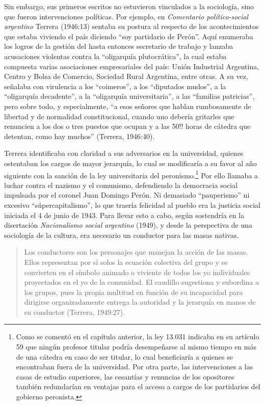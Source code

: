 Sin embargo, sus primeros escritos no estuvieron vinculados a la sociología, sino que fueron intervenciones políticas. Por ejemplo, en \emph{Comentario político-social argentino} Terrera (1946:13) sentaba su postura al respecto de los acontecimientos que estaba viviendo el país diciendo \enquote{soy partidario de Perón}. Aquí enumeraba los logros de la gestión del hasta entonces secretario de trabajo y lanzaba acusaciones violentas contra la \enquote{oligarquía plutocrática}, la cual estaba compuesta varias asociaciones empresariales del país: Unión Industrial Argentina, Centro y Bolsa de Comercio, Sociedad Rural Argentina, entre otras. A su vez, señalaba con virulencia a los \enquote{coimeros}, a los \enquote{diputados mudos}, a la \enquote{oligarquía decadente}, a la \enquote{oligarquía universitaria}, a las \enquote{familias patricias}, pero sobre todo, y especialmente, \enquote{a esos señores que hablan rumbosamente de libertad y de normalidad constitucional, cuando uno debería gritarles que renuncien a los dos o tres puestos que ocupan y a las 50!! horas de cátedra que detentan, como hay muchos} (Terrera, 1946:40).

Terrera identificaba con claridad a sus adversarios en la universidad, quienes ostentaban los cargos de mayor jerarquía, lo cual se modificaría a su favor al año siguiente con la sanción de la ley universitaria del peronismo.\footnote{Como se comentó en el capítulo anterior, la ley 13.031 indicaba en su artículo 59 que ningún profesor titular podría desempeñarse al mismo tiempo en más de una cátedra en caso de ser titular, lo cual beneficiaría a quienes se encontraban fuera de la universidad. Por otra parte, las intervenciones a las casas de estudio superiores, las cesantías y renuncias de los opositores también redundarían en ventajas para el acceso a cargos de los partidarios del gobierno peronista.} Por ello llamaba a luchar contra el nazismo y el comunismo, defendiendo la democracia social impulsada por el coronel Juan Domingo Perón. Ni demasiado \enquote{pauperismo} ni excesivo \enquote{súpercapitalismo}, lo que traería felicidad al pueblo era la justicia social iniciada el 4 de junio de 1943. Para llevar esto a cabo, según sostendría en la disertación \emph{Nacionalismo social argentino} (1949), y desde la perspectiva de una sociología de la cultura, era necesario un conductor para las masas nativas.

\begin{quote}
Los conductores son los personajes que manejan la acción de las masas. Ellos representan por sí solos la ecuación colectiva del grupo y se convierten en el símbolo animado o viviente de todos los yo individuales proyectados en el yo de la comunidad. El caudillo sugestiona y subordina a los grupos, pues la propia multitud en función de su incapacidad para dirigirse organizadamente entrega la autoridad y la jerarquía en manos de su conductor (Terrera, 1949:27).
\end{quote}

